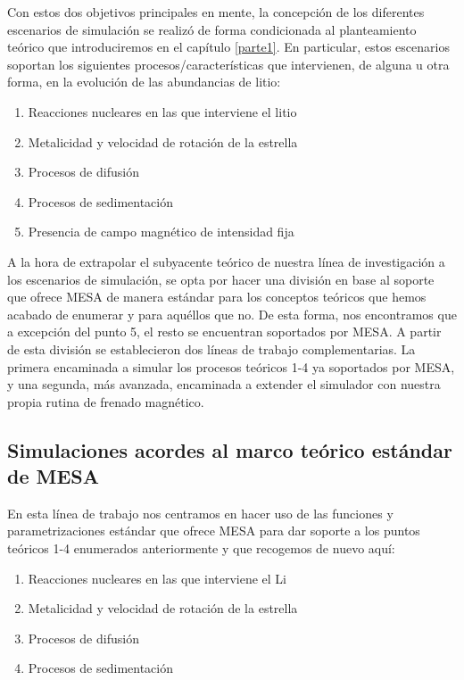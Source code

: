 Con estos dos objetivos principales en mente, la concepción de los diferentes escenarios de simulación se realizó de forma condicionada al planteamiento teórico que introduciremos en el capítulo \ref{parte1}. En particular, estos escenarios soportan los siguientes procesos/características que intervienen, de alguna u otra forma, en la evolución de las abundancias de litio:

\begin{enumerate}
    \item Reacciones nucleares en las que interviene el litio
    \item Metalicidad y velocidad de rotación de la estrella
    \item Procesos de difusión
    \item Procesos de sedimentación
    \item Presencia de campo magnético de intensidad fija
\end{enumerate}

A la hora de extrapolar el subyacente teórico de nuestra línea de investigación a los escenarios de simulación, se opta por hacer una división en base al soporte que ofrece MESA de manera estándar para los conceptos teóricos que hemos acabado de enumerar y para aquéllos que no. De esta forma, nos encontramos que a excepción del punto 5, el resto se encuentran soportados por MESA. A partir de esta división se establecieron dos líneas de trabajo complementarias. La primera encaminada a simular los procesos teóricos 1-4 ya soportados por MESA, y una segunda, más avanzada, encaminada a extender el simulador con nuestra propia rutina de frenado magnético.\par

\subsection{Simulaciones acordes al marco teórico estándar de MESA}
En esta línea de trabajo nos centramos en hacer uso de las funciones y parametrizaciones estándar que ofrece MESA para dar soporte a los puntos teóricos 1-4 enumerados anteriormente y que recogemos de nuevo aquí:

\begin{enumerate}
    \item Reacciones nucleares en las que interviene el Li
    \item Metalicidad y velocidad de rotación de la estrella
    \item Procesos de difusión
    \item Procesos de sedimentación
\end{enumerate}

